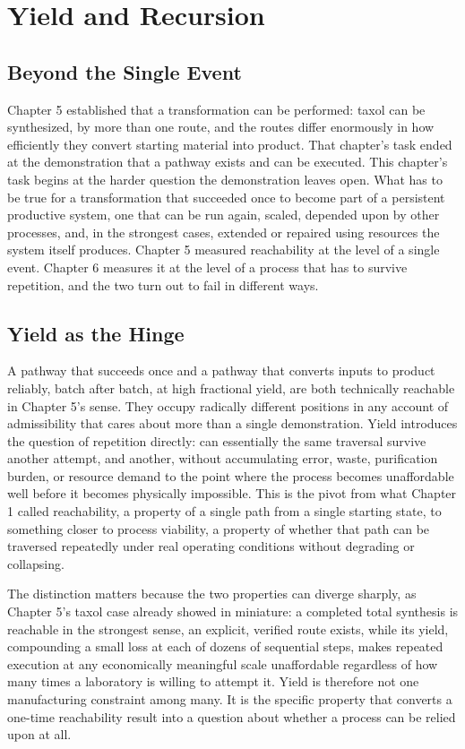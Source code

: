\documentclass[11pt]{book}
\begin{document}
\chapter{Yield and Recursion}

\section{Beyond the Single Event}

Chapter 5 established that a transformation can be performed: taxol can be synthesized, by more than one route, and the routes differ enormously in how efficiently they convert starting material into product. That chapter's task ended at the demonstration that a pathway exists and can be executed. This chapter's task begins at the harder question the demonstration leaves open. What has to be true for a transformation that succeeded once to become part of a persistent productive system, one that can be run again, scaled, depended upon by other processes, and, in the strongest cases, extended or repaired using resources the system itself produces. Chapter 5 measured reachability at the level of a single event. Chapter 6 measures it at the level of a process that has to survive repetition, and the two turn out to fail in different ways.

\section{Yield as the Hinge}

A pathway that succeeds once and a pathway that converts inputs to product reliably, batch after batch, at high fractional yield, are both technically reachable in Chapter 5's sense. They occupy radically different positions in any account of admissibility that cares about more than a single demonstration. Yield introduces the question of repetition directly: can essentially the same traversal survive another attempt, and another, without accumulating error, waste, purification burden, or resource demand to the point where the process becomes unaffordable well before it becomes physically impossible. This is the pivot from what Chapter 1 called reachability, a property of a single path from a single starting state, to something closer to process viability, a property of whether that path can be traversed repeatedly under real operating conditions without degrading or collapsing.

The distinction matters because the two properties can diverge sharply, as Chapter 5's taxol case already showed in miniature: a completed total synthesis is reachable in the strongest sense, an explicit, verified route exists, while its yield, compounding a small loss at each of dozens of sequential steps, makes repeated execution at any economically meaningful scale unaffordable regardless of how many times a laboratory is willing to attempt it. Yield is therefore not one manufacturing constraint among many. It is the specific property that converts a one-time reachability result into a question about whether a process can be relied upon at all.
\end{document}
